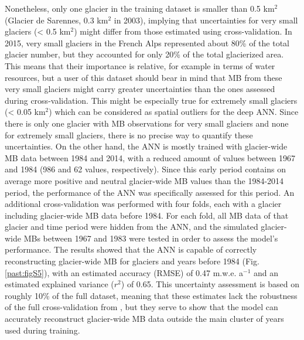 Nonetheless, only one glacier in the training dataset is smaller than 0.5 km$^{2}$ (Glacier de Sarennes, 0.3 km$^{2}$ in 2003), implying that uncertainties for very small glaciers (< 0.5 km$^{2}$) might differ from those estimated using cross-validation. In 2015, very small glaciers in the French Alps represented about 80\% of the total glacier number, but they accounted for only 20\% of the total glacierized area. This means that their importance is relative, for example in terms of water resources, but a user of this dataset should bear in mind that MB from these very small glaciers might carry greater uncertainties than the ones assessed during cross-validation. This might be especially true for extremely small glaciers (< 0.05 km$^{2}$) which can be considered as spatial outliers for the deep ANN. Since there is only one glacier with MB observations for very small glaciers and none for extremely small glaciers, there is no precise way to quantify these uncertainties. On the other hand, the ANN is mostly trained with glacier-wide MB data between 1984 and 2014, with a reduced amount of values between 1967 and 1984 (986 and 62 values, respectively). Since this early period contains on average more positive and neutral glacier-wide MB values than the 1984-2014 period, the performance of the ANN was specifically assessed for this period. An additional cross-validation was performed with four folds, each with a glacier including glacier-wide MB data before 1984. For each fold, all MB data of that glacier and time period were hidden from the ANN, and the simulated glacier-wide MBs between 1967 and 1983 were tested in order to assess the model’s performance. The results showed that the ANN is capable of correctly reconstructing glacier-wide MB for glaciers and years before 1984 (Fig. \ref{past:figS5}), with an estimated accuracy (RMSE) of 0.47 m.w.e. a$^{-1}$ and an estimated explained variance ($r^{2}$) of  0.65. This uncertainty assessment is based on roughly 10\% of the full dataset, meaning that these estimates lack the robustness of the full cross-validation from \citet{bolibar_deep_2020-1}, but they serve to show that the model can accurately reconstruct glacier-wide MB data outside the main cluster of years used during training. 

